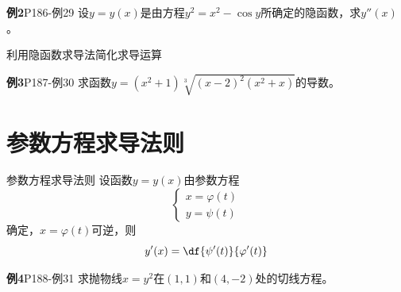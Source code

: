 \begin{frame}
	\linespread{1.5}
	\begin{exampleblock}{{\bf 例2}\hfill P186-例29}
		设$y=y(x)$是由方程$y^2=x^2-\cos y$所确定的隐函数，求$y''(x)$。
	\end{exampleblock}\pause 
	\begin{center}
	\end{center}
\end{frame}

\begin{frame}{利用隐函数求导法简化求导运算}
	\linespread{1.2}\pause 
	\begin{exampleblock}{{\bf 例3}\hfill P187-例30}
		求函数$y=(x^2+1)\sqrt[3]{(x-2)^2(x^2+x)}$的导数。
	\end{exampleblock}
\end{frame}

\section{参数方程求导法则}

\begin{frame}{参数方程求导法则}
	\linespread{1.2}\pause 
	设函数$y=y(x)$由参数方程
	$$\left\{
	\begin{array}{l}
	x=\varphi(t)\\
	y=\psi(t)
	\end{array}
	\right.$$
	确定，\pause $x=\varphi(t)$可逆，\pause 则
	$$y'(x)=\df{\psi'(t)}{\varphi'(t)}$$\pause 
	\begin{exampleblock}{{\bf 例4}\hfill P188-例31}
		求抛物线$x=y^2$在$(1,1)$和$(4,-2)$处的切线方程。
	\end{exampleblock}
\end{frame}

